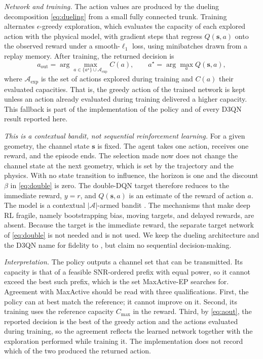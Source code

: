 \documentclass[correspondence]{IEEEtaes}
\begin{document}
\emph{Network and training.} The action values are produced by the dueling decomposition
\eqref{eq:dueling} from a small fully connected trunk. Training alternates
$\epsilon$-greedy exploration, which evaluates the capacity of each explored action with
the physical model, with gradient steps that regress $Q(\mathbf{s},a)$ onto the observed
reward under a smooth-$\ell_1$ loss, using minibatches drawn from a replay memory. After
training, the returned decision is
\begin{equation}
a_{\text{out}}=\arg\max_{a\in\{a^{\star}\}\cup\mathcal{A}_{\text{exp}}} C(a),
\qquad a^{\star}=\arg\max_{a}Q(\mathbf{s},a),
\label{eq:aout}
\end{equation}
where $\mathcal{A}_{\text{exp}}$ is the set of actions explored during training and $C(a)$
their evaluated capacities. That is, the greedy action of the trained network is kept
unless an action already evaluated during training delivered a higher capacity. This
fallback is part of the implementation of the policy and of every D3QN result reported
here.

\emph{This is a contextual bandit, not sequential reinforcement learning.} For a given
geometry, the channel state $\mathbf{s}$ is fixed. The agent takes one action, receives
one reward, and the episode ends. The selection made now does not change the channel state
at the next geometry, which is set by the trajectory and the physics. With no state
transition to influence, the horizon is one and the discount $\beta$ in \eqref{eq:double}
is zero. The double-DQN target therefore reduces to the immediate reward, $y=r$, and
$Q(\mathbf{s},a)$ is an estimate of the reward of action $a$. The model is a contextual
$|\mathcal{A}|$-armed bandit \cite{langford2007epoch}. The mechanisms that make deep RL
fragile, namely bootstrapping bias, moving targets, and delayed rewards, are absent.
Because the target is the immediate reward, the separate target network of
\eqref{eq:double} is not needed and is not used. We keep the dueling architecture and the
D3QN name for fidelity to \cite{elcik2025d3qn,wang2016dueling}, but claim no sequential
decision-making.

\emph{Interpretation.} The policy outputs a channel set that can be transmitted. Its
capacity is that of a feasible SNR-ordered prefix with equal power, so it cannot exceed
the best such prefix, which is the set MaxActive-EP searches for. Agreement with
MaxActive should be read with three qualifications. First, the policy can at best match
the reference; it cannot improve on it. Second, its training uses the reference capacity
$C_{\max}$ in the reward. Third, by \eqref{eq:aout}, the reported decision is the best of
the greedy action and the actions evaluated during training, so the agreement reflects the
learned network together with the exploration performed while training it. The
implementation does not record which of the two produced the returned action.
\end{document}
